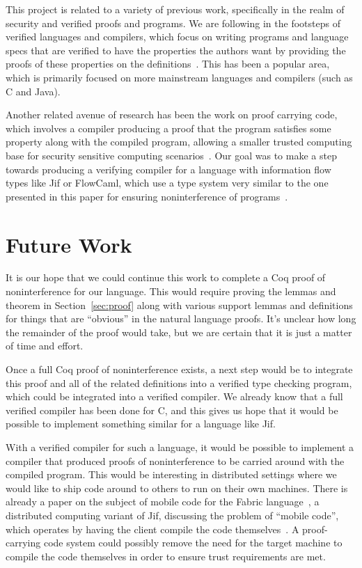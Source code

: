 \documentclass[a4paper,twocolumn]{article}
\theoremstyle{plain}
\theoremstyle{definition}
\begin{document}
This project is related to a variety of previous work, specifically in the realm
of security and verified proofs and programs.  We are following in the footsteps
of verified languages and compilers, which focus on writing programs and
language specs that are verified to have the properties the authors want by
providing the proofs of these properties on the
definitions~\cite{strecker2002formal,leinenbach2005towards,dave2003compiler,leroy2009formally,leroy2006formal,leroy2009formal,leroy2012compcert,chlipala2010verified,berghofer2004extracting}.
This has been a popular area, which is primarily focused on more mainstream
languages and compilers (such as C and Java).

Another related avenue of research has been the work on proof carrying code,
which involves a compiler producing a proof that the program satisfies some
property along with the compiled program, allowing a smaller trusted computing
base for security sensitive computing
scenarios~\cite{necula2002proof,necula1998design}.  Our goal was to make a step
towards producing a verifying compiler for a language with information flow
types like Jif or FlowCaml, which use a type system very similar to the one
presented in this paper for ensuring noninterference of
programs~\cite{InfoFlowML,myers1999jflow}.

\section{Future Work}
\label{sec:future}

It is our hope that we could continue this work to complete a Coq proof of
noninterference for our language.  This would require proving the lemmas and
theorem in Section~\ref{sec:proof} along with various support lemmas and
definitions for things that are ``obvious'' in the natural language proofs.
It's unclear how long the remainder of the proof would take, but we are certain
that it is just a matter of time and effort.

Once a full Coq proof of noninterference exists, a next step would be to
integrate this proof and all of the related definitions into a verified type
checking program, which could be integrated into a verified compiler.  We
already know that a full verified compiler has been done for C, and this gives
us hope that it would be possible to implement something similar for a language
like Jif.

With a verified compiler for such a language, it would be possible to implement
a compiler that produced proofs of noninterference to be carried around with the
compiled program.  This would be interesting in distributed settings where we
would like to ship code around to others to run on their own machines.  There is
already a paper on the subject of mobile code for the Fabric
language~\cite{liu2009fabric}, a distributed computing variant of Jif,
discussing the problem of ``mobile code'', which operates by having the client
compile the code themselves~\cite{arden2012sharing}.  A proof-carrying code
system could possibly remove the need for the target machine to compile the code
themselves in order to ensure trust requirements are met.
\end{document}
